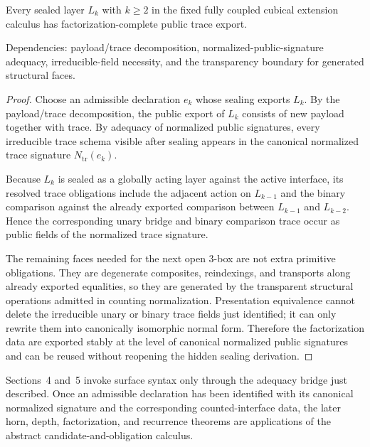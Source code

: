 \documentclass{lmcs}
\begin{document}
\begin{thm}
Every sealed layer \(L_k\) with \(k\geq 2\) in the fixed fully coupled cubical extension calculus
has factorization-complete public trace export.

Dependencies: payload/trace decomposition, normalized-public-signature adequacy,
irreducible-field necessity, and the transparency boundary for generated structural faces.
\end{thm}

\begin{proof}
Choose an admissible declaration \(e_k\) whose sealing exports \(L_k\).  By the
payload/trace decomposition, the public export of \(L_k\) consists of new payload together
with trace.  By adequacy of normalized public signatures, every irreducible trace schema
visible after sealing appears in the canonical normalized trace signature
\(N_{\mathrm{tr}}(e_k)\).

Because \(L_k\) is sealed as a globally acting layer against the active interface, its resolved
trace obligations include the adjacent action on \(L_{k-1}\) and the binary comparison against
the already exported comparison between \(L_{k-1}\) and \(L_{k-2}\).  Hence the corresponding
unary bridge and binary comparison trace occur as public fields of the normalized trace
signature.

The remaining faces needed for the next open \(3\)-box are not extra primitive obligations.
They are degenerate composites, reindexings, and transports along already exported equalities,
so they are generated by the transparent structural operations admitted in counting
normalization.  Presentation equivalence cannot delete the irreducible unary or binary trace
fields just identified; it can only rewrite them into canonically isomorphic normal form.
Therefore the factorization data are exported stably at the level of canonical normalized
public signatures and can be reused without reopening the hidden sealing derivation.
\end{proof}

\begin{rem}
Sections~4 and~5 invoke surface syntax only through the adequacy bridge just described.  Once
an admissible declaration has been identified with its canonical normalized signature and the
corresponding counted-interface data, the later horn, depth, factorization, and recurrence
theorems are applications of the abstract candidate-and-obligation calculus.
\end{rem}
\end{document}
